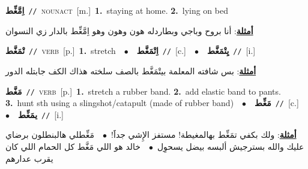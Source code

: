 \documentclass[10pt,a4paper,twoside]{article} %
\begin{document}
\begin{multicols}{2}
{\setlength\topsep{0pt}\textbf{\foreignlanguage{arabic}{اِمَّغِّط}}\ {\color{gray}\texttt{//}\color{black}}\ \textsc{noun\textunderscore act}\ [m.]\ \textbf{1.}~staying at home.  \textbf{2.}~lying on bed\  \begin{flushright}\color{gray}\foreignlanguage{arabic}{\textbf{\underline{\foreignlanguage{arabic}{أمثلة}}}: أنا بروح وباجي وبطاردله هون وهون وهو اِمَّغِّط بالدار زي النسوان}\end{flushright}\color{black}} \vspace{2mm}

{\setlength\topsep{0pt}\textbf{\foreignlanguage{arabic}{تْمَغَّط}}\ {\color{gray}\texttt{//}\color{black}}\ \textsc{verb}\ [p.]\ \textbf{1.}~stretch\ \ $\bullet$\ \ \setlength\topsep{0pt}\textbf{\foreignlanguage{arabic}{اِتْمَغَّط}}\ {\color{gray}\texttt{//}\color{black}}\ [c.]\ \ $\bullet$\ \ \setlength\topsep{0pt}\textbf{\foreignlanguage{arabic}{يِتْمَغَّط}}\ {\color{gray}\texttt{//}\color{black}}\ [i.]\  \begin{flushright}\color{gray}\foreignlanguage{arabic}{\textbf{\underline{\foreignlanguage{arabic}{أمثلة}}}: بس شافته المعلمة بيتْمَغَّط بالصف سلخته هذاك الكف جابتله الدور}\end{flushright}\color{black}} \vspace{2mm}

{\setlength\topsep{0pt}\textbf{\foreignlanguage{arabic}{مَغَّط}}\ {\color{gray}\texttt{//}\color{black}}\ \textsc{verb}\ [p.]\ \textbf{1.}~stretch a rubber band.  \textbf{2.}~add elastic band to pants.  \textbf{3.}~hunt sth using a slingshot/catapult (made of rubber band)\ \ $\bullet$\ \ \setlength\topsep{0pt}\textbf{\foreignlanguage{arabic}{مَغِّط}}\ {\color{gray}\texttt{//}\color{black}}\ [c.]\ \ $\bullet$\ \ \setlength\topsep{0pt}\textbf{\foreignlanguage{arabic}{يمَغِّط}}\ {\color{gray}\texttt{//}\color{black}}\ [i.]\  \begin{flushright}\color{gray}\foreignlanguage{arabic}{\textbf{\underline{\foreignlanguage{arabic}{أمثلة}}}: ولك بكفي تمَغِّط بهالمغيطة! مستفز الإِشي جداََ!\ $\bullet$\ \  مَغِّطلي هالبنطلون برضاي عليك والله بسترجيش ألبسه بيضل يسحوِل\ $\bullet$\ \  خالد هو اللي مَغَّط كل الحمام اللي كان يقرب عدارهم}\end{flushright}\color{black}} \vspace{2mm}


\end{multicols}
\end{document}
